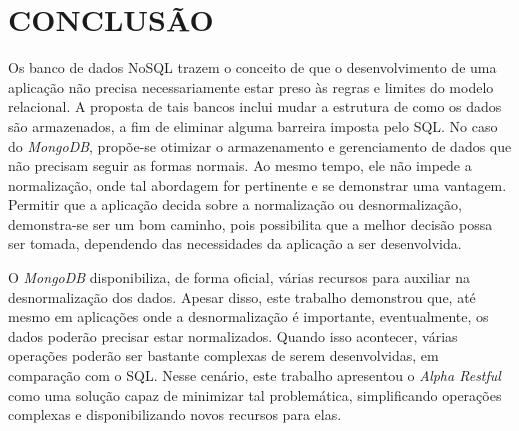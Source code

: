 \chapter{CONCLUSÃO}
\label{Conclusao}

Os banco de dados NoSQL trazem o conceito de que o desenvolvimento de uma aplicação não precisa necessariamente estar preso às regras e limites do modelo relacional. A proposta de tais bancos inclui mudar a estrutura de como os dados são armazenados, a fim de eliminar alguma barreira imposta pelo SQL. No caso do \textit{MongoDB}, propõe-se otimizar o armazenamento e gerenciamento de dados que não precisam seguir as formas normais. Ao mesmo tempo, ele não impede a normalização, onde tal abordagem for pertinente e se demonstrar uma vantagem. Permitir que a aplicação decida sobre a normalização ou desnormalização, demonstra-se ser um bom caminho, pois possibilita que a melhor decisão possa ser tomada, dependendo das necessidades da aplicação a ser desenvolvida.

O \textit{MongoDB} disponibiliza, de forma oficial, várias recursos para auxiliar na desnormalização dos dados. Apesar disso, este trabalho demonstrou que, até mesmo em aplicações onde a desnormalização é importante, eventualmente, os dados poderão precisar estar normalizados. Quando isso acontecer, várias operações poderão ser bastante complexas de serem desenvolvidas, em comparação com o SQL. Nesse cenário, este trabalho apresentou o \textit{Alpha Restful} como uma solução capaz de minimizar tal problemática, simplificando operações complexas e disponibilizando novos recursos para elas.



